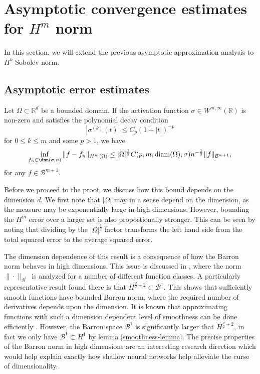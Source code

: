\newpage
\section{Asymptotic convergence estimates for $H^m$ norm}
In this section, we will extend the previous asymptotic approximation analysis 
to $H^k$ Sobolev norm. 

\subsection{Asymptotic error estimates}
\begin{theorem}\label{approximation_rate_theorem}
 Let $\Omega\subset \mathbb{R}^d$ be a bounded domain. If the activation function $\sigma\in W^{m,\infty}(\mathbb{R})$ is non-zero and satisfies the polynomial decay condition 
 \begin{equation}\label{growth_condition}
  |\sigma^{(k)}(t)| \leq C_p(1 + |t|)^{-p}
 \end{equation}
 for $0\leq k\leq m$ and some $p > 1$, we have
 \begin{equation}
  \inf_{f_n\in \dnn(\sigma,n)}\|f - f_n\|_{H^m(\Omega)} \leq |\Omega|^{\frac{1}{2}}C(p,m,\text{\normalfont diam}(\Omega),\sigma)n^{-\frac{1}{2}}\|f\|_{\mathcal{B}^{m+1}},
 \end{equation}
 for any $f\in \mathcal{B}^{m+1}$.
\end{theorem}
Before we proceed to the proof, we discuss how this bound depends on
the dimension $d$. We first note that $|\Omega|$ may in a sense depend
on the dimension, as the measure may be exponentially large in high
dimensions. However, bounding the $H^m$ error over a larger set is
also proportionally stronger. This can be seen by noting that dividing
by the $|\Omega|^\frac{1}{2}$ factor transforms the left hand side
from the total squared error to the average squared error.

The dimension dependence of this result is a consequence of how the
Barron norm behaves in high dimensions. This issue is discussed in
\cite{barron1993universal}, where the norm $\|\cdot\|_{\mathcal{B}^1}$
is analyzed for a number of different function classes. A particularly
representative result found there is that $H^{\frac{d}{2}+2}\subset
\mathcal{B}^1$. This shows that sufficiently smooth functions have
bounded Barron norm, where the required number of derivatives depends
upon the dimension. It is known that approximating functions with such
a dimension dependent level of smoothness can be done efficiently
\cite{petrushev1998approximation, kainen2007sobolev}. However, the
Barron space $\mathcal{B}^1$ is significantly larger that
$H^{\frac{d}{2}+2}$, in fact we only have $\mathcal{B}^1 \subset H^1$
by lemma \ref{smoothness-lemma}. The precise properties of the Barron
norm in high dimensions are an interesting research direction which
would help explain exactly how shallow neural networks help alleviate
the curse of dimensionality.


